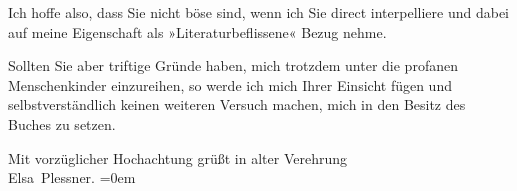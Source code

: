 \pstart
           Ich hoffe also, dass Sie nicht böse sind, wenn ich Sie direct interpelliere und dabei
               auf meine Eigenschaft als »Literaturbeflissene« Bezug nehme.\strikeout{,}\pend
           
\pstart
           Sollten Sie aber triftige Gründe haben, mich trotzdem unter die profanen
               Menschenkinder einzureihen, so werde ich mich Ihrer Einsicht fügen und
               selbstverständlich keinen weiteren Versuch machen, mich in den Besitz des Buches zu setzen.\pend
           
\pstart
           Mit vorzüglicher Hochachtung grüßt in alter Verehrung{\\[\baselineskip]}\spacefill\mbox{Elsa Plessner.}\pend
           \leftskip=0em{}\endnumbering{}
\begin{anhang}
\end{anhang}
      